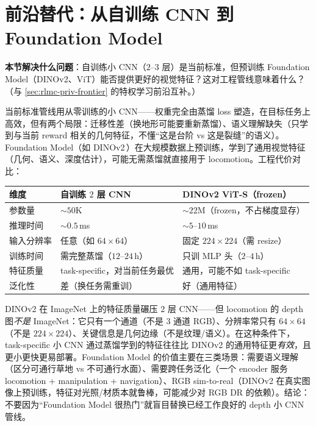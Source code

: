 \section{前沿替代：从自训练 CNN 到 Foundation Model}
\label{sec:rlmc-vm-frontier}

\textbf{本节解决什么问题}：自训练小 CNN（$2$--$3$ 层）是当前标准，但预训练 Foundation Model（DINOv2、ViT）能否提供更好的视觉特征？这对工程管线意味着什么？（与 \cref{sec:rlmc-priv-frontier} 的特权学习前沿互补。）

当前标准管线用从零训练的小 CNN——权重完全由蒸馏 loss 塑造，在目标任务上高效，但有两个局限：迁移性差（换地形可能要重新蒸馏）、语义理解缺失（只学到与当前 reward 相关的几何特征，不懂“这是台阶 vs 这是裂缝”的语义）。Foundation Model（如 DINOv2\,\cite{oquab2024dinov2}）在大规模数据上预训练，学到了通用视觉特征（几何、语义、深度估计），可能无需蒸馏就直接用于 locomotion。工程代价对比：

\begin{center}
\small
\begin{tabular}{@{}lll@{}}
\toprule
维度 & 自训练 $2$ 层 CNN & DINOv2 ViT-S（frozen） \\
\midrule
参数量 & $\sim 50$K & $\sim 22$M（frozen，不占梯度显存） \\
推理时间 & $\sim 0.5$\,ms & $\sim 5$--$10$\,ms \\
输入分辨率 & 任意（如 $64\times64$） & 固定 $224\times224$（需 resize） \\
训练时间 & 需完整蒸馏（$12$--$24$\,h） & 只训 MLP 头（$2$--$4$\,h） \\
特征质量 & task-specific，对当前任务最优 & 通用，可能不如 task-specific \\
泛化性 & 差（换任务需重训） & 好（通用特征） \\
\bottomrule
\end{tabular}
\end{center}

\begin{insight}\label{ins:rlmc-vm-fm}
DINOv2 在 ImageNet 上的特征质量碾压 $2$ 层 CNN——但 locomotion 的 depth 图\emph{不是} ImageNet：它只有一个通道（不是 $3$ 通道 RGB）、分辨率常只有 $64\times64$（不是 $224\times224$）、关键信息是几何边缘（不是纹理/语义）。在这种条件下，task-specific 小 CNN 通过蒸馏学到的特征往往比 DINOv2 的通用特征更\emph{有效}，且更小更快更易部署。Foundation Model 的价值主要在三类场景：需要语义理解（区分可通行草地 vs 不可通行水面）、需要跨任务泛化（一个 encoder 服务 locomotion + manipulation + navigation）、RGB sim-to-real（DINOv2 在真实图像上预训练，特征对光照/材质本就鲁棒，可能减少对 RGB DR 的依赖）。结论：不要因为“Foundation Model 很热门”就盲目替换已经工作良好的 depth 小 CNN 管线。
\end{insight}

